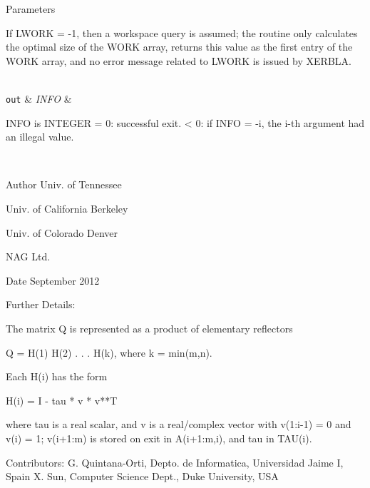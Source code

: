 \begin{DoxyParams}[1]{Parameters}
\begin{DoxyVerb}
          If LWORK = -1, then a workspace query is assumed; the routine
          only calculates the optimal size of the WORK array, returns
          this value as the first entry of the WORK array, and no error
          message related to LWORK is issued by XERBLA.\end{DoxyVerb}
\\
\hline
\mbox{\tt out}  & {\em I\+N\+F\+O} & \begin{DoxyVerb}          INFO is INTEGER
          = 0: successful exit.
          < 0: if INFO = -i, the i-th argument had an illegal value.\end{DoxyVerb}
 \\
\hline
\end{DoxyParams}
\begin{DoxyAuthor}{Author}
Univ. of Tennessee 

Univ. of California Berkeley 

Univ. of Colorado Denver 

N\+A\+G Ltd. 
\end{DoxyAuthor}
\begin{DoxyDate}{Date}
September 2012 
\end{DoxyDate}
\begin{DoxyParagraph}{Further Details\+: }
\begin{DoxyVerb}  The matrix Q is represented as a product of elementary reflectors

     Q = H(1) H(2) . . . H(k), where k = min(m,n).

  Each H(i) has the form

     H(i) = I - tau * v * v**T

  where tau is a real scalar, and v is a real/complex vector
  with v(1:i-1) = 0 and v(i) = 1; v(i+1:m) is stored on exit in
  A(i+1:m,i), and tau in TAU(i).\end{DoxyVerb}
 
\end{DoxyParagraph}
\begin{DoxyParagraph}{Contributors\+: }
G. Quintana-\/\+Orti, Depto. de Informatica, Universidad Jaime I, Spain X. Sun, Computer Science Dept., Duke University, U\+S\+A 
\end{DoxyParagraph}
\hypertarget{group__doubleGEcomputational_gaecad6eac294d2df861c6ae3b614c1ce8}{}
